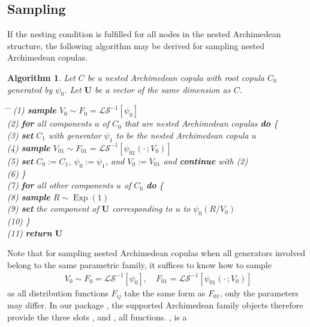 \documentclass[nojss,article]{jss}
\newcommand*{\myskipalgotext}{~\par\vspace{-1.2em}}%
\theoremstyle{mythmstyle}
\newtheorem{algorithm}[definition]{Algorithm}
\newcommand*{\R}{\proglang{R}}%
\newcommand*{\LS}{\mathcal{LS}}
\newcommand*{\LSi}{\LS^{-1}}
\newcommand*{\Exp}{\operatorname*{Exp}}
\begin{document}
\subsection{Sampling}
If the nesting condition is fulfilled for all %
nodes in the nested Archimedean structure, the
following algorithm may be derived for sampling nested Archimedean copulas.
\begin{algorithm}
  Let $C$ be a nested Archimedean copula with root copula $C_0$ generated by
  $\psi_0$. Let $\bm{U}$ be a vector of the same dimension as $C$.
  \myskipalgotext
  \linespread{1.22}\normalfont
  \begin{tabbing}
	\hspace{8mm} \= \hspace{4mm} \= \kill
	(1) \> \textbf{sample} $V_0\sim F_0=\LSi[\psi_0]$\\
	(2) \> \textbf{for} all components $u$ of $C_0$ that are nested
	 Archimedean copulas \textbf{do} \{\\
	(3) \>\> \textbf{set} $C_1$ with generator $\psi_1$ to be the nested
	 Archimedean copula $u$\\
	(4) \>\> \textbf{sample} $V_{01}\sim F_{01}=\LSi[\psi_{01}(\cdot\,;V_0)]$\\
	(5) \>\> \textbf{set} $C_0:=C_1$, $\psi_0:=\psi_1$, and $V_0:=V_{01}$ and \textbf{continue} with (2)\\
	(6) \> \}\\
	(7) \> \textbf{for} all other components $u$ of $C_0$ \textbf{do} \{\\
	(8) \>\> \textbf{sample} $R\sim\Exp(1)$\\
	(9) \>\> \textbf{set} the component of $\bm{U}$ corresponding to $u$
	 to $\psi_0(R/V_0)$\\
	(10) \> \}\\
	(11) \> \textbf{return} $\bm{U}$
   \end{tabbing}
\end{algorithm}
Note that for sampling nested Archimedean copulas when all generators
involved belong to the same parametric family, it suffices to know how to
sample
\begin{align*}
  V_0\sim F_0=\LSi[\psi_0],\quad F_{01}=\LSi[\psi_{01}(\cdot\,;V_0)]
\end{align*}
as all distribution functions $F_{ij}$ take the same form as $F_{01}$, only
the parameters may differ.
In our \R{} package , the supported Archimedean family
objects therefore provide the three slots ,  and ,
all functions. , is a
\end{document}
